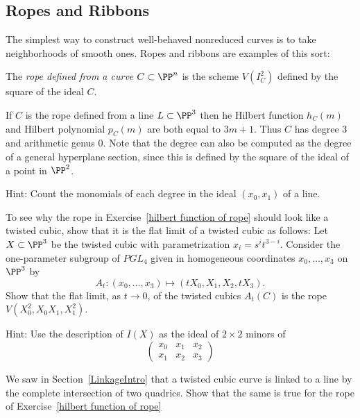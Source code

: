 \subsection{Ropes and Ribbons}
The simplest way to construct well-behaved nonreduced curves is
to take neighborhoods of smooth ones. Ropes and ribbons are examples of this sort:

\begin{definition}
The \emph{rope defined from a curve $C \subset \PP^n$} is the scheme $V(I^2_C)$ defined by the square of the ideal $C$.
\end{definition}

\begin{exercise}\label{hilbert function of rope}
If $C$ is the rope defined from a line $L\subset \PP^3$ then he Hilbert function $h_C(m)$ and Hilbert polynomial $p_C(m)$ are both equal to $3m+1$. Thus $C$ has degree 3 and
arithmetic genus 0. Note that the degree can also be computed as the degree of 
a general hyperplane section, since this is defined by the square of the ideal of a point
in $\PP^2$.

Hint: Count the monomials of each degree in the ideal $(x_0,x_1)$ of a line. 
\end{exercise}

\begin{exercise} To see why the rope in Exercise~\ref{hilbert function of rope} should look like a twisted cubic, show that it is the flat limit of a twisted cubic as follows:
 Let $X \subset \PP^3$ be the twisted cubic with parametrization $x_i = s^it^{3-i}$. Consider the one-parameter subgroup of $PGL_4$ given in homogeneous coordinates $x_0,\dots, x_3$ on $\PP^3$ by
$$
A_t : (x_0,\dots,x_3) \mapsto (tX_0, X_1, X_2,tX_3).
$$
Show that the flat limit, as $t\to 0$, of the twisted cubics $A_t(C)$ is the rope $V(X_0^2, X_0X_1,X_1^2)$.

Hint: Use the description of $I(X)$ as the ideal of $2\times 2$ minors of
$$
\begin{pmatrix}
 x_0 &x_1&x_2\\
x_1& x_2& x_3
\end{pmatrix}
$$
\end{exercise}
 
 
\begin{exercise}
We saw in Section~\ref{LinkageIntro} that a twisted cubic curve is linked to a line by the complete intersection
 of two quadrics. Show that the same is true for the rope of Exercise~\ref{hilbert function of rope} 
\end{exercise}
 
